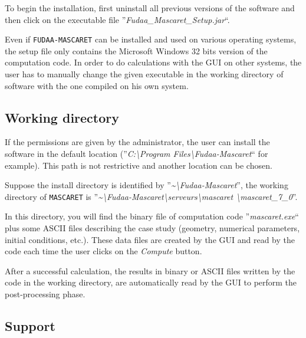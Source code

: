 \documentclass[a4paper,12pt]{article}
\begin{document}
\vspace{0.5cm}

To begin the installation, first uninstall all previous versions of the software and then click on the executable file ''\emph{Fudaa\_Mascaret\_Setup.jar}``.

\vspace{0.5cm}

Even if \texttt{FUDAA-MASCARET} can be installed and used on various operating systems, the setup file only contains the Microsoft Windows 32 bits version of the computation code. In order to do calculations
with the GUI on other systems, the user has to manually change the given executable in the working directory of software with the one compiled on his own system.

\subsection{Working directory}

If the permissions are given by the administrator, the user can install the software in the default location (''\emph{C:\textbackslash Program Files\textbackslash Fudaa-Mascaret}`` for example). This path is not restrictive and another location
can be chosen.

\vspace{0.5cm}

Suppose the install directory is identified by ''\emph{\textasciitilde \textbackslash Fudaa-Mascaret}'', the working directory of \texttt{MASCARET} is 
''\emph{\textasciitilde \textbackslash Fudaa-Mascaret\textbackslash serveurs\textbackslash mascaret \textbackslash mascaret\_7\_0}''. 

\vspace{0.5cm}

In this directory, you will find the binary file of computation code ''\emph{mascaret.exe}`` plus some ASCII files describing the case study (geometry, numerical parameters, initial conditions, etc.). These
data files are created by the GUI and read by the code each time the user clicks on the \textit{Compute} button.

\vspace{0.5cm}

After a successful calculation, the results in binary or ASCII files written by the code in the working directory, are automatically read by the GUI to perform the post-processing phase.

\subsection{Support}
\end{document}

